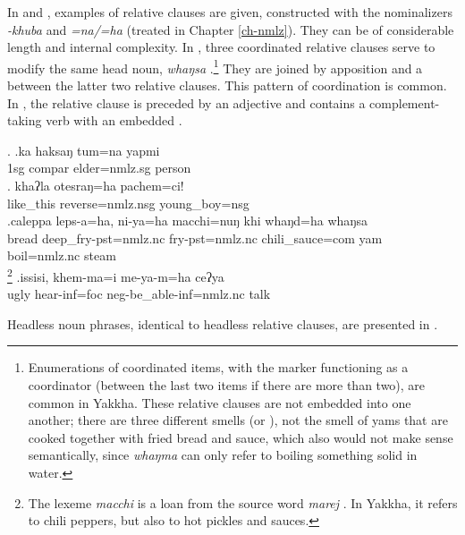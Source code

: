  In \Next and \NNext, examples of relative clauses are given, constructed with the nominalizers \emph{-khuba} and \emph{=na/=ha} (treated in Chapter \ref{ch-nmlz}). They can be of considerable length and internal complexity. 
 In \Next[c], three coordinated relative clauses  serve to modify the same head noun, \emph{whaŋsa} .\footnote{Enumerations of coordinated items, with the  marker functioning as a coordinator (between the last two items if there are more than two), are common in Yakkha. These relative clauses are not embedded into one  another; there are three different smells (or ), not the smell of yams that are cooked together with fried bread and sauce, which also would not make sense semantically, since \emph{whaŋma} can only refer to boiling something solid in water.} They are joined by apposition and a  between the latter two relative clauses. This pattern of coordination is common. In \Next[d], the relative clause is preceded by an adjective and contains a complement-taking verb with an embedded .
 
 \ex. \ag.ka  haksaŋ tum=na  yapmi\\
 {\sc 1sg} {\sc compar} elder{\sc =nmlz.sg} person\\
  
 \bg. khaʔla   otesraŋ=ha   pachem=ci!\\
 like\_this reverse{\sc =nmlz.nsg} young\_boy{\sc =nsg}\\
  
 \bg.caleppa leps-a=ha,     ni-ya=ha macchi=nuŋ    khi whaŋd=ha     whaŋsa\\
 bread deep\_fry{\sc [3sg]-pst=nmlz.nc} fry{\sc [3sg]-pst=nmlz.nc} chili\_sauce{\sc =com} yam boil{\sc [3sg;pst]=nmlz.nc} steam\\
 \footnote{The lexeme \emph{macchi} is a loan from the  source word \emph{marej} . In Yakkha, it refers to chili peppers, but also to hot pickles and sauces.} 
\bg.issisi, khem-ma=i          me-ya-m=ha                         ceʔya\\
ugly hear{\sc -inf=foc} {\sc neg-}be\_able{\sc -inf=nmlz.nc} talk\\
  

Headless noun phrases, identical to headless relative clauses, are presented in \Next. 

